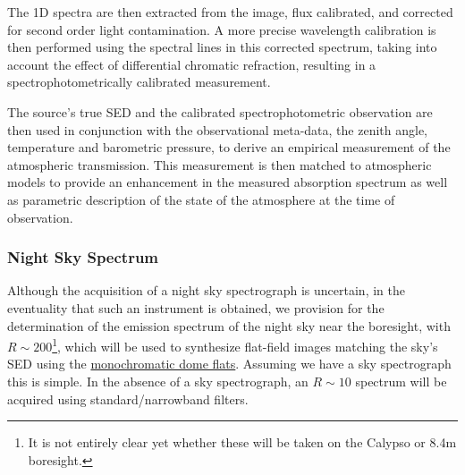 The 1D spectra are then extracted from the image, flux calibrated, and corrected for second order light contamination. A more precise wavelength calibration is then performed using the spectral lines in this corrected spectrum, taking into account the effect of differential chromatic refraction, resulting in a spectrophotometrically calibrated measurement.

The source's true SED and the calibrated spectrophotometric observation are then used in conjunction with the observational meta-data, \eg the zenith angle, temperature and barometric pressure, to derive an empirical measurement of the atmospheric transmission. This measurement is then matched to atmospheric models to provide an enhancement in the measured absorption spectrum as well as parametric description of the state of the atmosphere at the time of observation.


%


 
\subsubsection{Night Sky Spectrum}\label{sec:CPP:aux:nightSkySpectrum}
Although the acquisition of a night sky spectrograph is uncertain, in the eventuality that such an instrument is obtained, we provision for the determination of the emission spectrum of the night sky near the \auxtelescope boresight, with $R \sim 200$\footnote{It is not entirely clear yet whether these will be taken on the Calypso or 8.4m boresight.}, which will be used to synthesize flat-field images matching the sky's SED using the \hyperref[sec:CPP:output:monoFlat]{monochromatic dome flats}.
\alg Assuming we have a sky spectrograph this is simple. In the absence of a sky spectrograph, an $R \sim 10$ spectrum will be acquired using standard/narrowband filters.



